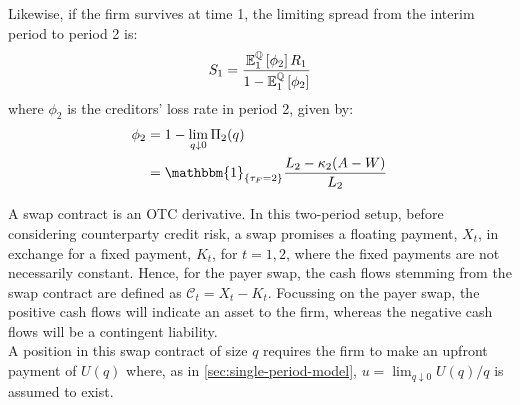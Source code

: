 \documentclass[main.tex]{subfiles}
\begin{document}
        Likewise, if the firm survives at time 1, 
        the limiting spread from the interim period to period 2 is:
        \begin{equation}
            S_1 =
            \frac{
                \mathbb{E}_{1}^{\mathbb{Q}}\left[\phi_2\right]R_1
            }{
                1 - \mathbb{E}_{1}^{\mathbb{Q}}\left[\phi_2\right] 
            }
        \end{equation}
        where $\phi_{2}$ is the creditors' loss rate in period 2, given by:
        \begin{align}
            \phi_2 
            &=
            1 - \lim_{q\downarrow0} \Pi_{2}(q) \\
            &=
            \mathbbm{1}_{\{\tau_{F}=2\}}
            \frac{
                L_{2}-\kappa_{2}(A-W)
            }{
                L_{2}
            }
        \end{align}

        A swap contract is an OTC derivative.
        In this two-period setup, before considering counterparty credit risk, a swap promises a floating payment, $X_t$, in exchange for a fixed payment, $K_t$, for $t = 1,2$, where the fixed payments are not necessarily constant.
        Hence, for the payer swap, the cash flows stemming from the swap contract are defined as $\mathcal{C}_t = X_t - K_t$.
        Focussing on the payer swap, the positive cash flows will indicate an asset to the firm, whereas the negative cash flows will be a contingent liability.
        \\
        A position in this swap contract of size $q$ requires the firm to make an upfront payment of $U(q)$ where, as in \cref{sec:single-period-model}, $u = \lim_{q \downarrow 0} U(q)/q$ is assumed to exist.
\end{document}
